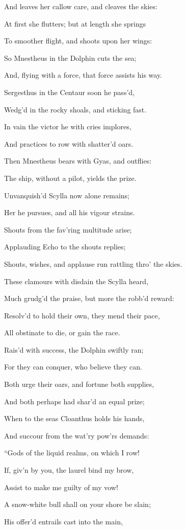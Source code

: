 And leaves her callow care, and cleaves the skies:

At first she flutters; but at length she springs

To smoother flight, and shoots upon her wings:

So Mnestheus in the Dolphin cuts the sea;

And, flying with a force, that force assists his way.

Sergesthus in the Centaur soon he pass’d,

Wedg’d in the rocky shoals, and sticking fast.

In vain the victor he with cries implores,

And practices to row with shatter’d oars.

Then Mnestheus bears with Gyas, and outflies:

The ship, without a pilot, yields the prize.

Unvanquish’d Scylla now alone remains;

Her he pursues, and all his vigour strains.

Shouts from the fav’ring multitude arise;

Applauding Echo to the shouts replies;

Shouts, wishes, and applause run rattling thro’ the skies.

These clamours with disdain the Scylla heard,

Much grudg’d the praise, but more the robb’d reward:

Resolv’d to hold their own, they mend their pace,

All obstinate to die, or gain the race.

Rais’d with success, the Dolphin swiftly ran;

For they can conquer, who believe they can.

Both urge their oars, and fortune both supplies,

And both perhaps had shar’d an equal prize;

When to the seas Cloanthus holds his hands,

And succour from the wat’ry pow’rs demands:

“Gods of the liquid realms, on which I row!

If, giv’n by you, the laurel bind my brow,

Assist to make me guilty of my vow!

A snow-white bull shall on your shore be slain;

His offer’d entrails cast into the main,

